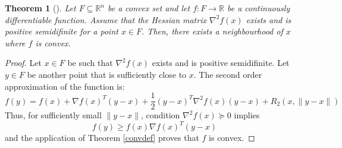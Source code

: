 \documentclass{book}
\newcommand{\R}{\mathbb{R}}
\theoremstyle{theoremv2}
\newtheorem{theorem}{Theorem}[chapter]
\theoremstyle{defv2}
\theoremstyle{remark}
\theoremstyle{remark}
\begin{document}
\begin{theorem}[]
    Let $F\subseteq \R^n$ be a convex set and let $f:F\to\R$ be a continuously differentiable function. Assume that the Hessian matrix $\nabla^2f(x)$ exists and is positive semidifinite for a point $x\in F$. Then, there exists a neighbourhood of $x$ where $f$ is convex.
\end{theorem}
\begin{proof}
    Let $x\in F$ be such that $\nabla^2f(x)$ exists and is positive semidifinite. Let $y\in F$ be another point that is sufficiently close to $x$. The second order approximation of the function is:
    \[
        f(y) = f(x) + \nabla f(x)^T (y-x) + \displaystyle\frac{1}{2}(y-x)^T\nabla^2 f(x) (y-x) + R_2(x,\|y-x\|)
    \]
    Thus, for sufficiently small $\|y-x\|$, condition $\nabla^2f(x)\succeq 0$ implies 
    \[
        f(y)\geq f(x)\nabla f(x)^T(y-x)
    \]
    and the application of Theorem \ref{convdef} proves that $f$ is convex.
\end{proof}
\end{document}
